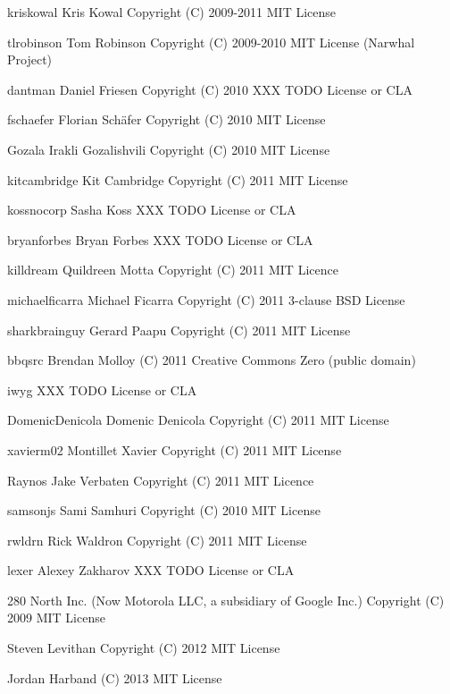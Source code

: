
\begin{DoxyItemize}
\item kriskowal Kris Kowal Copyright (C) 2009-\/2011 M\+I\+T License
\item tlrobinson Tom Robinson Copyright (C) 2009-\/2010 M\+I\+T License (Narwhal Project)
\item dantman Daniel Friesen Copyright (C) 2010 X\+X\+X T\+O\+D\+O License or C\+L\+A
\item fschaefer Florian Schäfer Copyright (C) 2010 M\+I\+T License
\item Gozala Irakli Gozalishvili Copyright (C) 2010 M\+I\+T License
\item kitcambridge Kit Cambridge Copyright (C) 2011 M\+I\+T License
\item kossnocorp Sasha Koss X\+X\+X T\+O\+D\+O License or C\+L\+A
\item bryanforbes Bryan Forbes X\+X\+X T\+O\+D\+O License or C\+L\+A
\item killdream Quildreen Motta Copyright (C) 2011 M\+I\+T Licence
\item michaelficarra Michael Ficarra Copyright (C) 2011 3-\/clause B\+S\+D License
\item sharkbrainguy Gerard Paapu Copyright (C) 2011 M\+I\+T License
\item bbqsrc Brendan Molloy (C) 2011 Creative Commons Zero (public domain)
\item iwyg X\+X\+X T\+O\+D\+O License or C\+L\+A
\item Domenic\+Denicola Domenic Denicola Copyright (C) 2011 M\+I\+T License
\item xavierm02 Montillet Xavier Copyright (C) 2011 M\+I\+T License
\item Raynos Jake Verbaten Copyright (C) 2011 M\+I\+T Licence
\item samsonjs Sami Samhuri Copyright (C) 2010 M\+I\+T License
\item rwldrn Rick Waldron Copyright (C) 2011 M\+I\+T License
\item lexer Alexey Zakharov X\+X\+X T\+O\+D\+O License or C\+L\+A
\item 280 North Inc. (Now Motorola L\+L\+C, a subsidiary of Google Inc.) Copyright (C) 2009 M\+I\+T License
\item Steven Levithan Copyright (C) 2012 M\+I\+T License
\item Jordan Harband (C) 2013 M\+I\+T License 
\end{DoxyItemize}